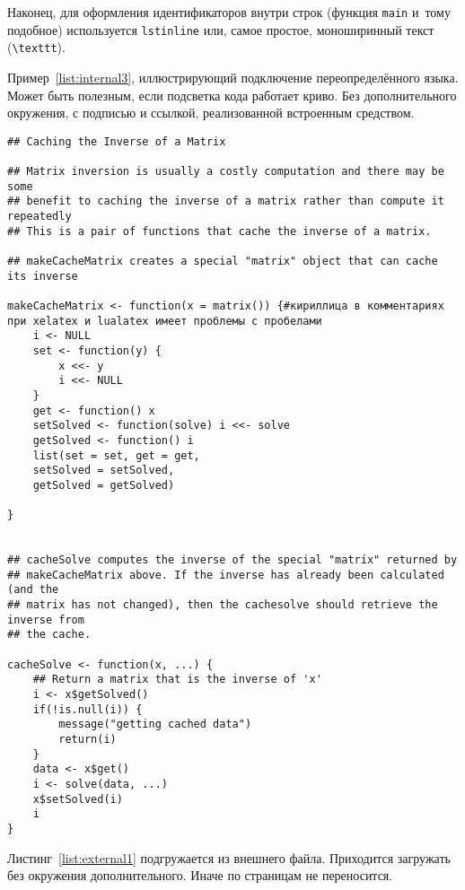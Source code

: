 Наконец, для оформления идентификаторов внутри строк
(функция \lstinline{main} и~тому подобное) используется
\texttt{lstinline} или, самое простое, моноширинный текст
(\texttt{\textbackslash texttt}).


Пример~\ref{list:internal3}, иллюстрирующий подключение переопределённого языка. Может быть полезным, если подсветка кода работает криво. Без дополнительного окружения, с подписью и ссылкой, реализованной встроенным средством.
\begingroup
\captiondelim{ } %
\begin{lstlisting}[language={Renhanced},caption={Пример листинга c подписью собственными средствами},label={list:internal3}]
## Caching the Inverse of a Matrix

## Matrix inversion is usually a costly computation and there may be some
## benefit to caching the inverse of a matrix rather than compute it repeatedly
## This is a pair of functions that cache the inverse of a matrix.

## makeCacheMatrix creates a special "matrix" object that can cache its inverse

makeCacheMatrix <- function(x = matrix()) {#кириллица в комментариях при xelatex и lualatex имеет проблемы с пробелами
    i <- NULL
    set <- function(y) {
        x <<- y
        i <<- NULL
    }
    get <- function() x
    setSolved <- function(solve) i <<- solve
    getSolved <- function() i
    list(set = set, get = get,
    setSolved = setSolved,
    getSolved = getSolved)
    
}


## cacheSolve computes the inverse of the special "matrix" returned by
## makeCacheMatrix above. If the inverse has already been calculated (and the
## matrix has not changed), then the cachesolve should retrieve the inverse from
## the cache.

cacheSolve <- function(x, ...) {
    ## Return a matrix that is the inverse of 'x'
    i <- x$getSolved()
    if(!is.null(i)) {
        message("getting cached data")
        return(i)
    }
    data <- x$get()
    i <- solve(data, ...)
    x$setSolved(i)
    i  
}
\end{lstlisting} %
\endgroup

Листинг~\ref{list:external1} подгружается из внешнего файла. Приходится загружать без окружения дополнительного. Иначе по страницам не переносится.
\begingroup
\captiondelim{ } %
    
\endgroup

